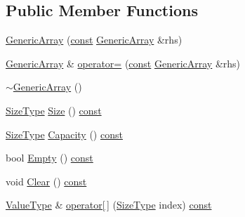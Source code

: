 \subsection*{Public Member Functions}
\begin{DoxyCompactItemize}
\item 
\mbox{\hyperlink{classrapidjson_1_1_generic_array_ae59cd71ac1e26cc66ae0269991f82f26}{Generic\+Array}} (\mbox{\hyperlink{classrapidjson_1_1_generic_array_a363f892bf386776e236f5db273f2599f}{const}} \mbox{\hyperlink{classrapidjson_1_1_generic_array}{Generic\+Array}} \&rhs)
\item 
\mbox{\hyperlink{classrapidjson_1_1_generic_array}{Generic\+Array}} \& \mbox{\hyperlink{classrapidjson_1_1_generic_array_ab9c9bffca8056d6b20b9f92334d35798}{operator=}} (\mbox{\hyperlink{classrapidjson_1_1_generic_array_a363f892bf386776e236f5db273f2599f}{const}} \mbox{\hyperlink{classrapidjson_1_1_generic_array}{Generic\+Array}} \&rhs)
\item 
\mbox{\hyperlink{classrapidjson_1_1_generic_array_a3ac4b469ea0a9034533fd4cbdbfc8616}{$\sim$\+Generic\+Array}} ()
\item 
\mbox{\hyperlink{namespacerapidjson_a44eb33eaa523e36d466b1ced64b85c84}{Size\+Type}} \mbox{\hyperlink{classrapidjson_1_1_generic_array_ad0473410a03268bbc25cb6d95ecc9925}{Size}} () \mbox{\hyperlink{classrapidjson_1_1_generic_array_a363f892bf386776e236f5db273f2599f}{const}}
\item 
\mbox{\hyperlink{namespacerapidjson_a44eb33eaa523e36d466b1ced64b85c84}{Size\+Type}} \mbox{\hyperlink{classrapidjson_1_1_generic_array_a78052c2a7bb54ee4ea7579df5eab480c}{Capacity}} () \mbox{\hyperlink{classrapidjson_1_1_generic_array_a363f892bf386776e236f5db273f2599f}{const}}
\item 
bool \mbox{\hyperlink{classrapidjson_1_1_generic_array_aaa816f9b2ab65c842c343e5dbe99d876}{Empty}} () \mbox{\hyperlink{classrapidjson_1_1_generic_array_a363f892bf386776e236f5db273f2599f}{const}}
\item 
void \mbox{\hyperlink{classrapidjson_1_1_generic_array_a1b671cc963732398d9234cf01aa339ab}{Clear}} () \mbox{\hyperlink{classrapidjson_1_1_generic_array_a363f892bf386776e236f5db273f2599f}{const}}
\item 
\mbox{\hyperlink{classrapidjson_1_1_generic_array_aebd828a2f020262b41af908fbb28a571}{Value\+Type}} \& \mbox{\hyperlink{classrapidjson_1_1_generic_array_ae3455ca0429fa330cb981c78fab473c0}{operator\mbox{[}$\,$\mbox{]}}} (\mbox{\hyperlink{namespacerapidjson_a44eb33eaa523e36d466b1ced64b85c84}{Size\+Type}} index) \mbox{\hyperlink{classrapidjson_1_1_generic_array_a363f892bf386776e236f5db273f2599f}{const}}

\end{DoxyCompactItemize}
